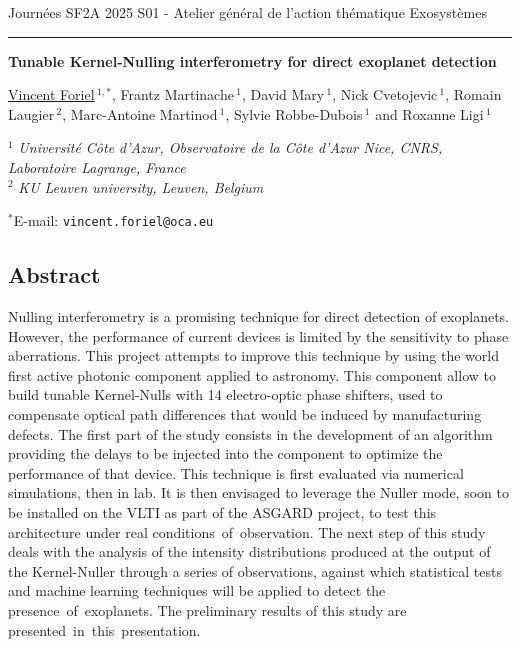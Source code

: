 \documentclass[12pt]{article}
\begin{document}
Journées SF2A 2025
\hfill
S01 - Atelier général de l'action thématique Exosystèmes

\smallskip
\hrule

\bigskip

\begin{center}
\LARGE \bf Tunable Kernel-Nulling interferometry for direct exoplanet detection\rm

\vspace{0.5cm}

\large  \underline{Vincent Foriel}$\,^{1,*}$, \large Frantz Martinache$\,^1$, \large David Mary$\,^1$, \large Nick Cvetojevic$\,^1$, \large Romain Laugier$\,^2$, Marc-Antoine Martinod$\,^1$, \large Sylvie Robbe-Dubois$\,^1$ and  \large Roxanne Ligi$\,^1$

\vspace{0.5cm}

\normalsize

$^1$ \textit{Université Côte d’Azur, Observatoire de la Côte d’Azur Nice, CNRS, Laboratoire Lagrange, France}\\
$^2$ \textit{KU Leuven university, Leuven, Belgium}

\vspace{0.3cm}
$^*$E-mail: {\tt vincent.foriel@oca.eu}

\end{center}
\vspace{-0.8cm}
\subsection*{\Large Abstract}

Nulling interferometry\cite{Bracewell 1979} is a promising technique for direct detection of exoplanets. However, the performance of current devices is limited by the sensitivity to phase aberrations. This project attempts to improve this technique by using the world first active photonic component applied to astronomy. This component allow to build tunable Kernel-Nulls\cite{Martinache et al. 2018} with 14 electro-optic phase shifters, used to compensate optical path differences that would be induced by manufacturing defects. The first part of the study consists in the development of an algorithm providing the delays to be injected into the component to optimize the performance of that device. This technique is first evaluated via numerical simulations, then in lab. It is then envisaged to leverage the Nuller mode, soon to be installed on the VLTI as part of the ASGARD project, to test this architecture under real conditions of observation. The next step of this study deals with the analysis of the intensity distributions produced at the output of the Kernel-Nuller\cite{Martinache et al. 2018, Cvetojevic et al. 2022} through a series of observations, against which statistical tests and machine learning techniques will be applied to detect the presence of exoplanets. The preliminary results of this study are presented in this presentation.
\end{document}
